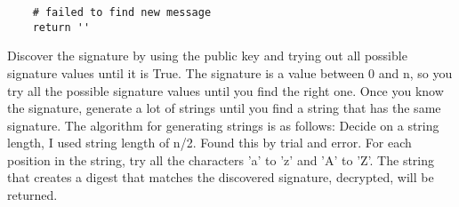 \documentclass[11pt]{article}
\begin{document}
\begin{enumerate}
\begin{verbatim}
    # failed to find new message
    return ''

\end{verbatim}

Discover the signature by using the public key and trying out all possible signature values until it is True.
The signature is a value between 0 and n, so you try all the possible signature values until you find the right one.
Once you know the signature, generate a lot of strings until you find a string that has the same signature.
The algorithm for generating strings is as follows:
Decide on a string length, I used string length of n/2. Found this by trial and error. For each position in the string, try all the characters 'a' to 'z' and 'A' to 'Z'. The string that creates a digest that matches the discovered signature, decrypted, will be returned.

\end{enumerate}
\end{document}
